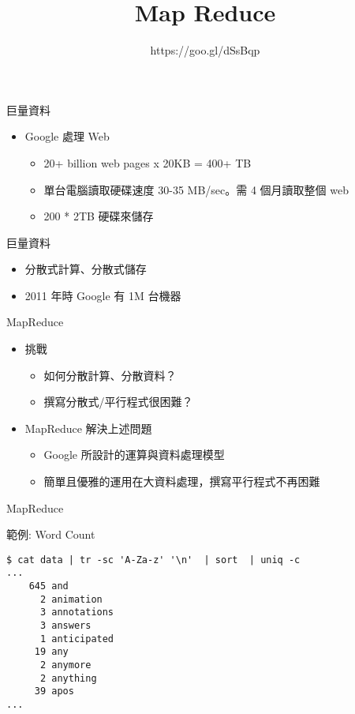 \documentclass[12pt,c]{beamer}
\title{Map Reduce}
\subtitle{https://goo.gl/dSsBqp}
\begin{document}
\begin{frame}
  \titlepage
\end{frame}

\begin{frame}{巨量資料}
\begin{itemize}
  \item Google 處理 Web

  \begin{itemize}
    \item 20+ billion web pages x 20KB = 400+ TB
    \item 單台電腦讀取硬碟速度 30-35 MB/sec。需 4 個月讀取整個 web
    \item 200 * 2TB 硬碟來儲存
  \end{itemize}
\end{itemize}
\end{frame}

\begin{frame}{巨量資料}
  \begin{itemize}
    \item 分散式計算、分散式儲存 
    \item 2011 年時 Google 有 1M 台機器
    \end{itemize}
\end{frame}

\begin{frame}{MapReduce}
\begin{itemize}
\item 挑戰
\begin{itemize}
\item 如何分散計算、分散資料？
\item 撰寫分散式/平行程式很困難？
\end{itemize}
\item MapReduce 解決上述問題
\begin{itemize}
  \item Google 所設計的運算與資料處理模型
  \item 簡單且優雅的運用在大資料處理，撰寫平行程式不再困難
\end{itemize}
\end{itemize}
  


\end{frame}

\begin{frame}{MapReduce}
\end{frame}

\begin{frame}[containsverbatim]{範例: Word Count}
\begin{verbatim}
$ cat data | tr -sc 'A-Za-z' '\n'  | sort  | uniq -c
...
    645 and
      2 animation
      3 annotations
      3 answers
      1 anticipated
     19 any
      2 anymore
      2 anything
     39 apos
...
\end{verbatim}
\end{frame}
\end{document}
